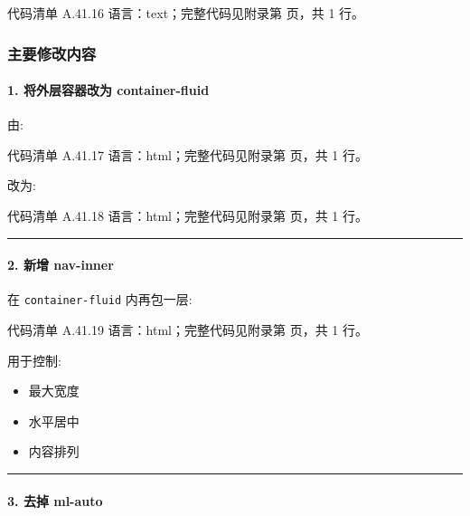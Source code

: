 \documentclass[lang=cn,scheme=chinese,color=blue,device=normal,toc=onecol,math=cm]{elegantbook}
\begin{document}
\begin{codeindexbox}{代码清单 A.41.16}
语言：text；完整代码见附录第 \pageref{code:41:16} 页，共 1 行。
\end{codeindexbox}


\subsubsection{主要修改内容}


\paragraph{1. 将外层容器改为 container-fluid}


由:\par


\begin{codeindexbox}{代码清单 A.41.17}
语言：html；完整代码见附录第 \pageref{code:41:17} 页，共 1 行。
\end{codeindexbox}


改为:\par


\begin{codeindexbox}{代码清单 A.41.18}
语言：html；完整代码见附录第 \pageref{code:41:18} 页，共 1 行。
\end{codeindexbox}


\medskip\hrule\medskip


\paragraph{2. 新增 nav-inner}


在 \texttt{container-fluid} 内再包一层:\par


\begin{codeindexbox}{代码清单 A.41.19}
语言：html；完整代码见附录第 \pageref{code:41:19} 页，共 1 行。
\end{codeindexbox}


用于控制:\par


\begin{itemize}
\item 最大宽度
\item 水平居中
\item 内容排列
\end{itemize}


\medskip\hrule\medskip


\paragraph{3. 去掉 ml-auto}
\end{document}
